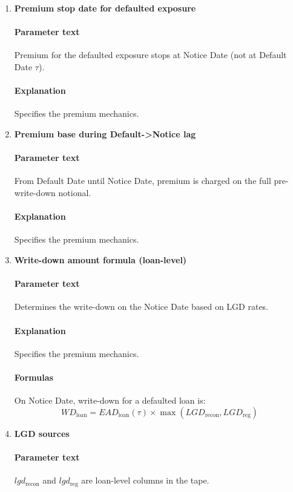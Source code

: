 \documentclass[11pt]{article}
\begin{document}
\begin{enumerate}[label=\arabic*),leftmargin=*,align=left]
\paragraph{Explanation} Specifies the premium mechanics.

\item \textbf{Premium stop date for defaulted exposure}
\paragraph{Parameter text} Premium for the defaulted exposure stops at Notice Date (not at Default Date $\tau$).
\paragraph{Explanation} Specifies the premium mechanics.

\item \textbf{Premium base during Default->Notice lag}
\paragraph{Parameter text} From Default Date until Notice Date, premium is charged on the full pre-write-down notional.
\paragraph{Explanation} Specifies the premium mechanics.

\item \textbf{Write-down amount formula (loan-level)}
\paragraph{Parameter text} Determines the write-down on the Notice Date based on LGD rates.
\paragraph{Explanation} Specifies the premium mechanics.
\paragraph{Formulas} On Notice Date, write-down for a defaulted loan is:
\[ WD_{\text{loan}} = EAD_{\text{loan}}(\tau) \times \max(LGD_{\text{recon}}, LGD_{\text{reg}}) \]

\item \textbf{LGD sources}
\paragraph{Parameter text} $lgd_{\text{recon}}$ and $lgd_{\text{reg}}$ are loan-level columns in the tape.

\end{enumerate}
\end{document}
